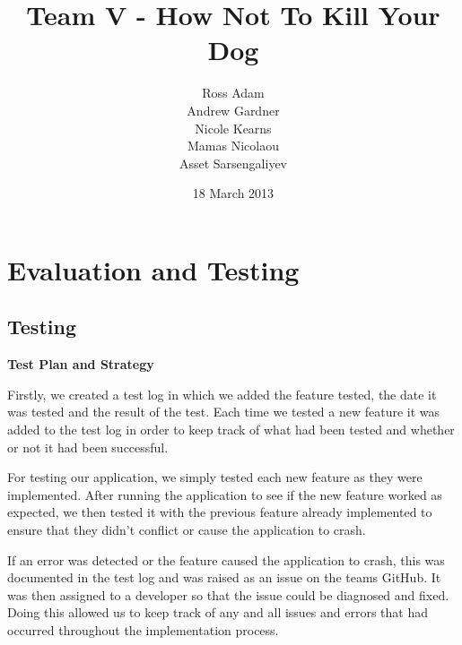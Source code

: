 \documentclass{l3proj}
\begin{document}
\title{Team V - How Not To Kill Your Dog}
\author{Ross Adam \\
        Andrew Gardner \\
        Nicole Kearns \\
        Mamas Nicolaou \\
        Asset Sarsengaliyev}
\date{18 March 2013}
\maketitle
\tableofcontents

\chapter{Evaluation and Testing}
\label{evaluation}

\section{Testing}

\textbf{Test Plan and Strategy}



Firstly, we created a test log in which we added the feature tested, the date it was tested and the result of the test. Each time we tested a new feature it was added to the test log in order to keep track of what had been tested and whether or not it had been successful.

For testing our application, we simply tested each new feature as they were implemented. After running the application to see if the new feature worked as expected, we then tested it with the previous feature already implemented to ensure that they didn't conflict or cause the application to crash.

If an error was detected or the feature caused the application to
crash, this was documented in the test log and was raised as an issue
on the teams GitHub. It was then assigned to a developer so that the
issue could be diagnosed and fixed. Doing this allowed us to keep
track of any and all issues and errors that had occurred throughout
the implementation process.
\end{document}
